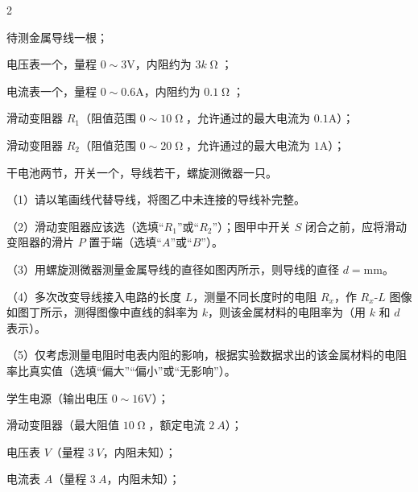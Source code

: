 \documentclass[fontset=none]{ctexart}
\begin{document}
\begin{multicols}{2}




待测金属导线一根；

电压表一个，量程 $0\sim3$\unit{V}，内阻约为 $\unit{3k\upOmega}$；

电流表一个，量程 $0\sim0.6$\unit{A}，内阻约为 $\unit{0.1\upOmega}$；

滑动变阻器 $R_{1}$（阻值范围 $0\sim10\unit{\upOmega}$，允许通过的最大电流为 $0.1$\unit{A}）；

滑动变阻器 $R_{2}$（阻值范围 $0\sim20\unit{\upOmega}$，允许通过的最大电流为 $1$\unit{A}）；

干电池两节，开关一个，导线若干，螺旋测微器一只。


（1）请以笔画线代替导线，将图乙中未连接的导线补完整\kongbai。

（2）滑动变阻器应该选\kongbai（选填“$R_{1}$”或“$R_{2}$”）；图甲中开关 $\unit{S}$ 闭合之前，应将滑动变阻器的滑片 $\unit{P}$ 置于\kongbai{}端（选填“$A$”或“$B$”）。

（3）用螺旋测微器测量金属导线的直径如图丙所示，则导线的直径 $d=$\kongbai\unit{mm}。

（4）多次改变导线接入电路的长度 $L$，测量不同长度时的电阻 $R_{x}$，作 $R_{x}$-$L$ 图像如图丁所示，测得图像中直线的斜率为 $k$，则该金属材料的电阻率为\kongbai（用 $k$ 和 $d$ 表示）。

（5）仅考虑测量电阻时电表内阻的影响，根据实验数据求出的该金属材料的电阻率比真实值\kongbai（选填“偏大”“偏小”或“无影响”）。



学生电源（输出电压 $0\sim16$\unit{V}）；

滑动变阻器（最大阻值 $\unit{10\upOmega}$，额定电流 $\unit{2\ A}$）；

电压表 $V$（量程 $\unit{3\ V}$，内阻未知）；

电流表 $A$（量程 $\unit{3\ A}$，内阻未知）；


\end{multicols}
\end{document}
